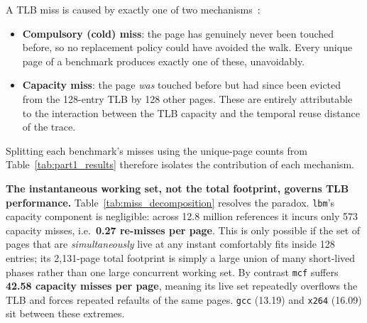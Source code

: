 \documentclass[11pt,a4paper]{article}
\begin{document}
A TLB miss is caused by exactly one of two mechanisms~\cite{stallings}:
\begin{itemize}
    \item \textbf{Compulsory (cold) miss}: the page has genuinely never been touched before, so no replacement policy could have avoided the walk. Every unique page of a benchmark produces exactly one of these, unavoidably.
    \item \textbf{Capacity miss}: the page \emph{was} touched before but had since been evicted from the 128-entry TLB by 128 other pages. These are entirely attributable to the interaction between the TLB capacity and the temporal reuse distance of the trace.
\end{itemize}
Splitting each benchmark's misses using the unique-page counts from Table~\ref{tab:part1_results} therefore isolates the contribution of each mechanism.

\begin{table}[h]
\centering
\caption{Decomposition of TLB Misses into Compulsory and Capacity Components}
\label{tab:miss_decomposition}
\end{table}

\noindent\textbf{The instantaneous working set, not the total footprint, governs TLB performance.}
Table~\ref{tab:miss_decomposition} resolves the paradox. \texttt{lbm}'s capacity component is negligible: across 12.8 million references it incurs only 573 capacity misses, i.e.\ \textbf{0.27 re-misses per page}. This is only possible if the set of pages that are \emph{simultaneously} live at any instant comfortably fits inside 128 entries; its 2,131-page total footprint is simply a large union of many short-lived phases rather than one large concurrent working set. By contrast \texttt{mcf} suffers \textbf{42.58 capacity misses per page}, meaning its live set repeatedly overflows the TLB and forces repeated refaults of the same pages. \texttt{gcc} (13.19) and \texttt{x264} (16.09) sit between these extremes.
\end{document}
